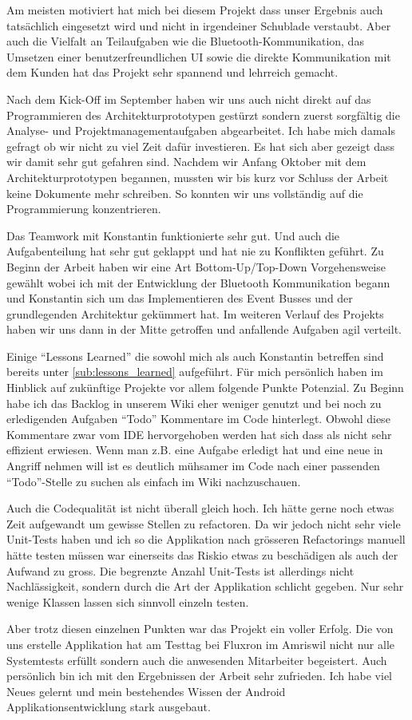 Am meisten motiviert hat mich bei diesem Projekt dass unser Ergebnis auch tatsächlich eingesetzt wird und nicht in irgendeiner Schublade verstaubt. Aber auch die Vielfalt an Teilaufgaben wie die Bluetooth-Kommunikation, das Umsetzen einer benutzerfreundlichen UI sowie die direkte Kommunikation mit dem Kunden  hat das Projekt sehr spannend und lehrreich gemacht. 

Nach dem Kick-Off im September haben wir uns auch nicht direkt auf das Programmieren des Architekturprototypen gestürzt sondern zuerst sorgfältig die Analyse- und Projektmanagementaufgaben abgearbeitet. Ich habe mich damals gefragt ob wir nicht zu viel Zeit dafür investieren. Es hat sich aber gezeigt dass wir damit sehr gut gefahren sind. Nachdem wir Anfang Oktober mit dem Architekturprototypen begannen, mussten wir bis kurz vor Schluss der Arbeit keine Dokumente mehr schreiben. So konnten wir uns vollständig auf die Programmierung konzentrieren. 

Das Teamwork mit Konstantin funktionierte sehr gut. Und auch die Aufgabenteilung hat sehr gut geklappt und hat nie zu Konflikten geführt. Zu Beginn der Arbeit haben wir eine Art Bottom-Up/Top-Down Vorgehensweise gewählt wobei ich mit der Entwicklung der Bluetooth Kommunikation begann und Konstantin sich um das Implementieren des Event Busses und der grundlegenden Architektur gekümmert hat. Im weiteren Verlauf des Projekts haben wir uns dann in der Mitte getroffen und anfallende Aufgaben agil verteilt.

Einige \enquote{Lessons Learned} die sowohl mich als auch Konstantin betreffen sind bereits unter \ref{sub:lessons_learned} aufgeführt. Für mich persönlich haben im Hinblick auf zukünftige Projekte vor allem folgende Punkte Potenzial. Zu Beginn habe ich das Backlog in unserem Wiki eher weniger genutzt und bei noch zu erledigenden Aufgaben \enquote{Todo} Kommentare im Code hinterlegt. Obwohl diese Kommentare zwar vom \ac{IDE} hervorgehoben werden hat sich dass als nicht sehr effizient erwiesen. Wenn man z.B. eine Aufgabe erledigt hat und eine neue in Angriff nehmen will ist es deutlich mühsamer im Code nach einer passenden \enquote{Todo}-Stelle zu suchen als einfach im Wiki nachzuschauen.

Auch die Codequalität ist nicht überall gleich hoch. Ich hätte gerne noch etwas Zeit aufgewandt um gewisse Stellen zu refactoren. Da wir jedoch nicht sehr viele Unit-Tests haben und ich so die Applikation nach grösseren Refactorings manuell hätte testen müssen war einerseits das Riskio etwas zu beschädigen als auch der Aufwand zu gross. Die begrenzte Anzahl Unit-Tests ist allerdings nicht Nachlässigkeit, sondern durch die Art der Applikation schlicht gegeben. Nur sehr wenige Klassen lassen sich sinnvoll einzeln testen. 

Aber trotz diesen einzelnen Punkten war das Projekt ein voller Erfolg. Die von uns erstelle Applikation hat am Testtag bei Fluxron im Amriswil nicht nur alle Systemtests erfüllt sondern auch die anwesenden Mitarbeiter begeistert. Auch persönlich bin ich mit den Ergebnissen der Arbeit sehr zufrieden. Ich habe viel Neues gelernt und mein bestehendes Wissen der Android Applikationsentwicklung stark ausgebaut.